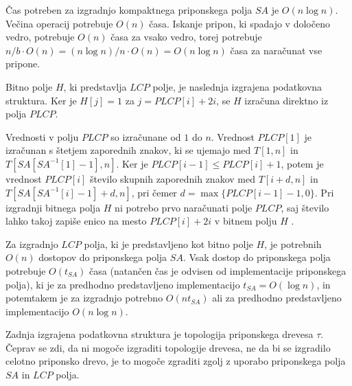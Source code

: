 Čas potreben za izgradnjo kompaktnega priponskega polja $SA$ je $O(n\log{n})$. Večina operacij potrebuje $O(n)$ časa. Iskanje pripon, ki spadajo v določeno vedro, potrebuje $O(n)$ časa za vsako vedro, torej potrebuje $n/b\cdot O(n)=(n\log{n})/n\cdot O(n)=O(n\log{n})$ časa za naračunat vse pripone. 

Bitno polje $H$, ki predstavlja $LCP$ polje, je naslednja izgrajena podatkovna struktura. Ker je $H[j]=1$ za $j=PLCP[i]+2i$, se $H$ izračuna direktno iz polja $PLCP$.

Vrednosti v polju $PLCP$ so izračunane od $1$ do $n$. Vrednost $PLCP[1]$ je izračunan s štetjem zaporednih znakov, ki se ujemajo med $T[1,n]$ in $T[SA[SA^{-1}[1]-1],n]$. Ker je $PLCP[i-1]\le PLCP[i]+1$, potem je vrednost $PLCP[i]$ število skupnih zaporednih znakov med $T[i+d,n]$ in $T[SA[SA^{-1}[i]-1]+d,n]$, pri čemer $d=\max\{PLCP[i-1]-1,0\}$.
Pri izgradnji bitnega polja $H$ ni potrebo prvo naračunati polje $PLCP$, saj število lahko takoj zapiše enico na mesto $PLCP[i]+2i$ v bitnem polju $H$ \cite{Navarro2016}.

Za izgradnjo $LCP$ polja, ki je predstavljeno kot bitno polje $H$, je potrebnih $O(n)$ dostopov do priponskega polja $SA$. Vsak dostop do priponskega polja potrebuje $O(t_{SA})$ časa (natančen čas je odvisen od implementacije priponskega polja), ki je za predhodno predstavljeno implementacijo $t_{SA}= O(\log{n})$, in potemtakem je za izgradnjo potrebno $O(nt_{SA})$ ali za predhodno predstavljeno implementacijo $O(n\log{n})$.

Zadnja izgrajena podatkovna struktura je topologija priponskega drevesa $\tau$. Čeprav se zdi, da ni mogoče izgraditi topologije drevesa, ne da bi se izgradilo celotno priponsko drevo, je to mogoče zgraditi zgolj z uporabo priponskega polja $SA$ in $LCP$ polja.

